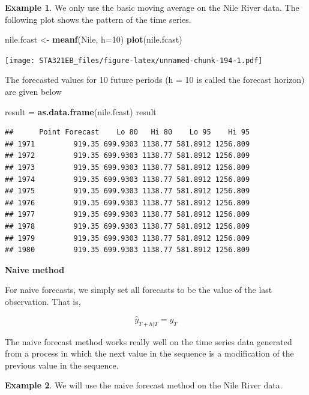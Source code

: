 \documentclass[
]{book}
\newenvironment{Shaded}{\begin{snugshade}}{\end{snugshade}}
\newcommand{\AttributeTok}[1]{\textcolor[rgb]{0.13,0.29,0.53}{#1}}
\newcommand{\DecValTok}[1]{\textcolor[rgb]{0.00,0.00,0.81}{#1}}
\newcommand{\FunctionTok}[1]{\textcolor[rgb]{0.13,0.29,0.53}{\textbf{#1}}}
\newcommand{\NormalTok}[1]{#1}
\newcommand{\OtherTok}[1]{\textcolor[rgb]{0.56,0.35,0.01}{#1}}
\begin{document}
\textbf{Example 1}. We only use the basic moving average on the Nile River data. The following plot shows the pattern of the time series.

\begin{Shaded}
\begin{Highlighting}[]
\NormalTok{nile.fcast }\OtherTok{\textless{}{-}} \FunctionTok{meanf}\NormalTok{(Nile, }\AttributeTok{h=}\DecValTok{10}\NormalTok{)}
\FunctionTok{plot}\NormalTok{(nile.fcast)}
\end{Highlighting}
\end{Shaded}

\texttt{[image: STA321EB\_files/figure-latex/unnamed-chunk-194-1.pdf]}

The forecasted values for 10 future periods (h = 10 is called the forecast horizon) are given below

\begin{Shaded}
\begin{Highlighting}[]
\NormalTok{result }\OtherTok{=} \FunctionTok{as.data.frame}\NormalTok{(nile.fcast)}
\NormalTok{result}
\end{Highlighting}
\end{Shaded}

\begin{verbatim}
##      Point Forecast    Lo 80   Hi 80    Lo 95    Hi 95
## 1971         919.35 699.9303 1138.77 581.8912 1256.809
## 1972         919.35 699.9303 1138.77 581.8912 1256.809
## 1973         919.35 699.9303 1138.77 581.8912 1256.809
## 1974         919.35 699.9303 1138.77 581.8912 1256.809
## 1975         919.35 699.9303 1138.77 581.8912 1256.809
## 1976         919.35 699.9303 1138.77 581.8912 1256.809
## 1977         919.35 699.9303 1138.77 581.8912 1256.809
## 1978         919.35 699.9303 1138.77 581.8912 1256.809
## 1979         919.35 699.9303 1138.77 581.8912 1256.809
## 1980         919.35 699.9303 1138.77 581.8912 1256.809
\end{verbatim}

\textbf{Naive method}

For naive forecasts, we simply set all forecasts to be the value of the last observation. That is,

\[
 \hat{y}_{T+h|T} = y_T
 \]

The naive forecast method works really well on the time series data generated from a process in which the next value in the sequence is a modification of the previous value in the sequence.

\textbf{Example 2}. We will use the naive forecast method on the Nile River data.
\end{document}
